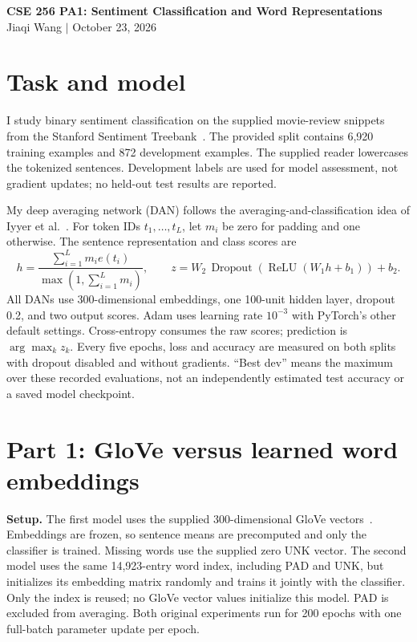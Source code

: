\documentclass[11pt,letterpaper]{article}
\begin{document}
\begin{center}
    {\Large\bfseries CSE 256 PA1: Sentiment Classification and Word Representations}\\[5pt]
    Jiaqi Wang \quad $\vert$ \quad October 23, 2026
\end{center}

\section{Task and model}
I study binary sentiment classification on the supplied movie-review snippets from
the Stanford Sentiment Treebank~\cite{socher}. The provided split contains 6,920
training examples and 872 development examples. The supplied reader lowercases
the tokenized sentences. Development labels are used for model assessment, not
gradient updates; no held-out test results are reported.

My deep averaging network (DAN) follows the averaging-and-classification idea
of Iyyer et al.~\cite{iyyer}. For token IDs $t_1,\ldots,t_L$, let $m_i$ be zero
for padding and one otherwise. The sentence representation and class scores are
\[
 h=\frac{\sum_{i=1}^{L}m_i e(t_i)}{\max(1,\sum_{i=1}^{L}m_i)},
 \qquad
 z=W_2\,\operatorname{Dropout}\!\left(\operatorname{ReLU}(W_1h+b_1)\right)+b_2.
\]
All DANs use 300-dimensional embeddings, one 100-unit hidden layer, dropout 0.2,
and two output scores. Adam uses learning rate $10^{-3}$ with PyTorch's other
default settings. Cross-entropy consumes the raw scores; prediction is
$\arg\max_k z_k$. Every five epochs, loss and accuracy are measured on both
splits with dropout disabled and without gradients. ``Best dev'' means the
maximum over these recorded evaluations, not an independently estimated test
accuracy or a saved model checkpoint.
 
\section{Part 1: GloVe versus learned word embeddings}
\textbf{Setup.} The first model uses the supplied 300-dimensional GloVe
vectors~\cite{glove}. Embeddings are frozen, so sentence means are precomputed
and only the classifier is trained. Missing words use the supplied zero UNK
vector. The second model uses the same 14,923-entry word index, including PAD
and UNK, but initializes its embedding matrix randomly and trains it jointly
with the classifier. Only the index is reused; no GloVe vector values initialize
this model. PAD is excluded from averaging. Both original experiments run for
200 epochs with one full-batch parameter update per epoch.
\end{document}
